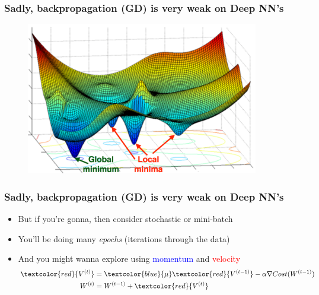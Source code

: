\documentclass[xcolor={dvipsnames}]{beamer}
\begin{document}
\frame
{
 \frametitle{Sadly, backpropagation (GD) is very weak on Deep NN's}
\begin{figure}
\centering
\includegraphics[width=4in]{stuff/minmax.png}
\end{figure}
}

\frame
{
 \frametitle{Sadly, backpropagation (GD) is very weak on Deep NN's}

\begin{itemize}
\item<1-> But if you're gonna, then consider stochastic or mini-batch
\item<2-> You'll be doing many \emph{epochs} (iterations through the data)
\item<3-> And you might wanna explore using \textcolor{blue}{momentum} and \textcolor{red}{velocity} 
\begin{align*}
\textcolor{red}{V^{(t)}} = {}& \textcolor{blue}{\mu} \textcolor{red}{V^{(t-1)}} - \alpha \nabla Cost(W^{(t-1)})\\
W^{(t)} = {}& W^{(t-1)} + \textcolor{red}{V^{(t)}}
\end{align*}
\end{itemize}
\vspace{-1em}
}
\end{document}
